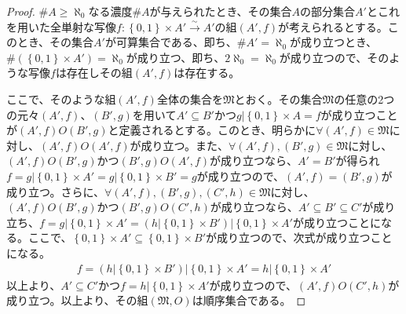 \documentclass[dvipdfmx]{jsarticle}
\begin{document}
\begin{proof}
$\# A \geq \aleph_{0}$なる濃度$\# A$が与えられたとき、その集合$A$の部分集合$A'$とこれを用いた全単射な写像$f:\left\{ 0,1 \right\} \times A'\overset{\sim}{\rightarrow}A'$の組$\left( A',f \right)$が考えられるとする。このとき、その集合$A'$が可算集合である、即ち、$\# A' = \aleph_{0}$が成り立つとき、$\# \left( \left\{ 0,1 \right\} \times A' \right) = \aleph_{0}$が成り立つ、即ち、$2\aleph_{0} = \aleph_{0}$が成り立つので、そのような写像$f$は存在しその組$\left( A',f \right)$は存在する。\par
ここで、そのような組$\left( A',f \right)$全体の集合を$\mathfrak{M}$とおく。その集合$\mathfrak{M}$の任意の2つの元々$\left( A',f \right)$、$\left( B',g \right)$を用いて$A' \subseteq B'$かつ$g|\left\{ 0,1 \right\} \times A = f$が成り立つことが$\left( A',f \right)O\left( B',g \right)$と定義されるとする。このとき、明らかに$\forall\left( A',f \right)\in \mathfrak{M}$に対し、$\left( A',f \right)O\left( A',f \right)$が成り立つ。また、$\forall\left( A',f \right),\left( B',g \right)\in \mathfrak{M}$に対し、$\left( A',f \right)O\left( B',g \right)$かつ$\left( B',g \right)O\left( A',f \right)$が成り立つなら、$A' = B'$が得られ$f = g|\left\{ 0,1 \right\} \times A' = g|\left\{ 0,1 \right\} \times B' = g$が成り立つので、$\left( A',f \right) = \left( B',g \right)$が成り立つ。さらに、$\forall\left( A',f \right),\left( B',g \right),\left( C',h \right)\in \mathfrak{M}$に対し、$\left( A',f \right)O\left( B',g \right)$かつ$\left( B',g \right)O\left( C',h \right)$が成り立つなら、$A' \subseteq B' \subseteq C'$が成り立ち、$f = g|\left\{ 0,1 \right\} \times A' = \left( h|\left\{ 0,1 \right\} \times B' \right)|\left\{ 0,1 \right\} \times A'$が成り立つことになる。ここで、$\left\{ 0,1 \right\} \times A' \subseteq \left\{ 0,1 \right\} \times B'$が成り立つので、次式が成り立つことになる。
\begin{align*}
f = \left( h|\left\{ 0,1 \right\} \times B' \right)|\left\{ 0,1 \right\} \times A' = h|\left\{ 0,1 \right\} \times A'
\end{align*}
以上より、$A' \subseteq C'$かつ$f = h|\left\{ 0,1 \right\} \times A'$が成り立つので、$\left( A',f \right)O\left( C',h \right)$が成り立つ。以上より、その組$\left( \mathfrak{M,}O \right)$は順序集合である。\par

\end{proof}
\end{document}

